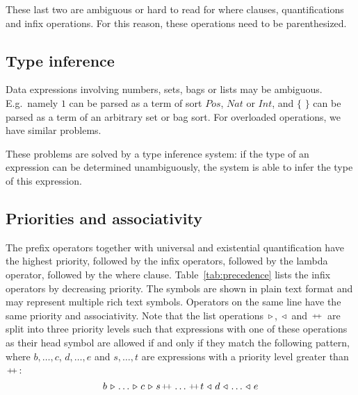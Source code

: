 \documentclass[a4paper,fleqn]{article}
\newcommand{\frm}[1]{\mbox{\ensuremath{#1}}}
\newcommand{\f}[1]{\ensuremath{\mathit{#1}}}
\newcommand{\set}[1]{\ensuremath{\{\,#1\,\}}}
\newcommand{\cons}{\ensuremath{\hspace{0.12em}\triangleright\hspace{0.08em}}}
\newcommand{\snoc}{\ensuremath{\hspace{0.08em}\triangleleft\hspace{0.12em}}}
\newcommand{\concat}{\ensuremath{\hspace{0.12em}\raisebox{0.2ex}
{\text{\scriptsize+}\!\text{\scriptsize+}}\hspace{0.12em}}}
\newcommand{\srtpos}{\f{Pos}}
\newcommand{\srtnat}{\f{Nat}}
\newcommand{\srtint}{\f{Int}}
\begin{document}
\noindent
These last two are ambiguous or hard to read for where clauses, quantifications
and infix operations. For this reason, these operations need to be
parenthesized.

\subsection{Type inference}

Data expressions involving numbers, sets, bags or lists may be ambiguous. E.g.\
namely \frm{1} can be parsed as a term of sort \frm{\srtpos}, \frm{\srtnat} or
\frm{\srtint}, and \frm{\set{}} can be parsed as a term of an arbitrary set or
bag sort. For overloaded operations, we have similar problems.

These problems are solved by a type inference system: if the type of an
expression can be determined unambiguously, the system is able to infer the
type of this expression.

\subsection{Priorities and associativity}

The prefix operators together with universal and existential quantification
have the highest priority, followed by the infix operators, followed by the
lambda operator, followed by the where clause. Table~\ref{tab:precedence} lists
the infix operators by decreasing priority. The symbols are shown in plain text
format and may represent multiple rich text symbols. Operators on the same line
have the same priority and associativity. Note that the list operations
\frm{\cons}, \frm{\snoc} and \frm{\concat} are split into three priority levels
such that expressions with one of these operations as their head symbol are
allowed if and only if they match the following pattern, where \frm{b, \ldots,
c}, \frm{d, \ldots, e} and \frm{s, \ldots, t} are expressions with a priority
level greater than \frm{\concat}:
\[
b \cons \dots \cons c \cons s \concat \dots \concat t \snoc d \snoc \dots
\snoc e
\]
 
\end{document}
